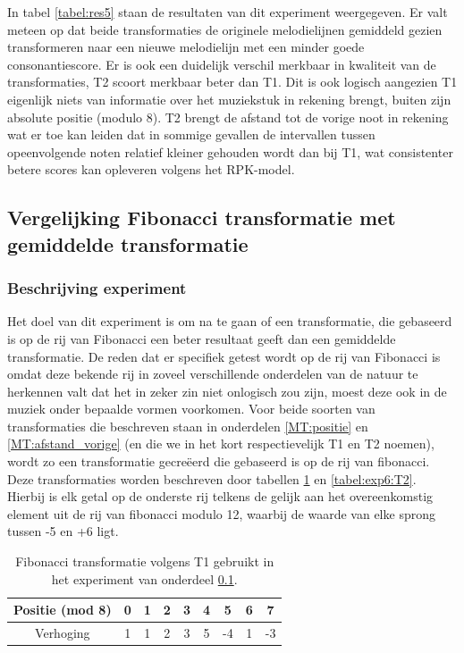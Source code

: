 In tabel \ref{tabel:res5} staan de resultaten van dit experiment weergegeven. Er valt meteen op dat beide transformaties de originele melodielijnen gemiddeld gezien transformeren naar een nieuwe melodielijn met een minder goede consonantiescore. Er is ook een duidelijk verschil merkbaar in kwaliteit van de transformaties, T2 scoort merkbaar beter dan T1. Dit is ook logisch aangezien T1 eigenlijk niets van informatie over het muziekstuk in rekening brengt, buiten zijn absolute positie (modulo 8). T2 brengt de afstand tot de vorige noot in rekening wat er toe kan leiden dat in sommige gevallen de intervallen tussen opeenvolgende noten relatief kleiner gehouden wordt dan bij T1, wat consistenter betere scores kan opleveren volgens het RPK-model.

\subsection{Vergelijking Fibonacci transformatie met gemiddelde transformatie}
\label{experiment:6}
\subsubsection{Beschrijving experiment}
Het doel van dit experiment is om na te gaan of een transformatie, die gebaseerd is op de rij van Fibonacci een beter resultaat geeft dan een gemiddelde transformatie. De reden dat er specifiek getest wordt op de rij van Fibonacci is omdat deze bekende rij in zoveel verschillende onderdelen van de natuur te herkennen valt dat het in zeker zin niet onlogisch zou zijn, moest deze ook in de muziek onder bepaalde vormen voorkomen. Voor beide soorten van transformaties die beschreven staan in onderdelen \ref{MT:positie} en \ref{MT:afstand_vorige} (en die we in het kort respectievelijk T1 en T2 noemen), wordt zo een transformatie gecre\"eerd die gebaseerd is op de rij van fibonacci. Deze transformaties worden beschreven door tabellen \ref{tabel:exp6:T1} en \ref{tabel:exp6:T2}. Hierbij is elk getal op de onderste rij telkens de gelijk aan het overeenkomstig element uit de rij van fibonacci modulo 12, waarbij de waarde van elke sprong tussen -5 en +6 ligt.

\begin{table}
  \centering
  \begin{tabular}{c | c c c c c c c c }
    Positie (mod 8) & 0 & 1 & 2 & 3 & 4 & 5 & 6 & 7 \\
    \hline
    \hline
    Verhoging & 1 & 1 & 2 & 3 & 5 & -4 & 1 & -3 \\
  \end{tabular}
  \caption{Fibonacci transformatie volgens T1 gebruikt in het experiment van onderdeel \ref{experiment:6}.}
  \label{tabel:exp6:T1}
\end{table}

